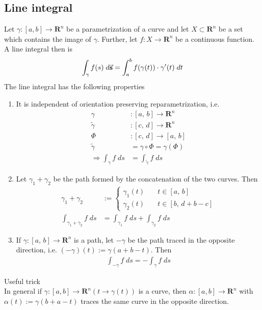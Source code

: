 \documentclass[8pt]{extarticle}
\newcommand{\R}{{\mathbb R}}
\newcommand{\X}{{\mathcal X}}
\newcommand{\ra}{{\rightarrow}}
\newcommand{\Ra}{{\Rightarrow}}
\def\R{\mathbf{R}}
\def\X{X}
\begin{document}
\begin{multicols*}{3}
  \subsection{Line integral}
  Let $\gamma: [a, b] \ra \R^n$ be a parametrization
  of a curve and let $\X \subset \R^n$ be a set which contains
  the image of $\gamma$. Further, let $f: \X \ra \R^n$ be a continuous
  function. A line integral then is
  \begin{align*}
    \int_\gamma f(s) \; d \vectorarrow{s} = \int_a^b f(\gamma(t)) \cdot \gamma'(t) \; dt
  \end{align*}
  The line integral has the following properties
  \begin{enumerate}[label=(\arabic*)]
    \item It is independent of orientation preserving reparametrization, i.e.
          \begin{align*}
            \gamma                  & : [a,\, b] \ra \R^n                      \\
            \tilde{\gamma}          & : [c,\, d] \ra \R^n                      \\
            \varPhi                 & : [c, \, d] \ra [a, \, b]                \\
            \tilde{\gamma}          & = \gamma \circ \varPhi = \gamma(\varPhi) \\
            \Ra \int_\gamma f \; ds & = \int_{\tilde{\gamma}} f \; ds
          \end{align*}
    \item Let $\gamma_1 + \gamma_2$ be the path formed
          by the concatenation of the two curves. Then
          \begin{align*}
            \gamma_1 + \gamma_2                & :=
            \begin{cases}
              \gamma_1(t) \quad & t \in [a, \, b]         \\
              \gamma_2(t) \quad & t \in [b, \, d + b - c]
            \end{cases}                                                              \\
            \int_{\gamma_1 + \gamma_2} f \; ds & = \int_{\gamma_1} f \; ds + \int_{\gamma_2} f\; ds
          \end{align*}
    \item If $\gamma: [a, \, b] \ra \R^n$ is a path, let $-\gamma$
          be the path traced in the opposite direction, i.e.
          $(-\gamma)(t) := \gamma(a + b - t)$. Then
          \begin{align*}
            \int_{-\gamma} f \; ds = - \int_\gamma f \; ds
          \end{align*}
  \end{enumerate}
Useful trick\\
In general if $\gamma : [a, b] \rightarrow \R^n(t \rightarrow \gamma(t))$ is a curve, then $\alpha : [a, b] \rightarrow \R^n$ with $\alpha(t) := \gamma(b + a - t)$ traces the same curve in the opposite direction.

\end{multicols*}
\end{document}
